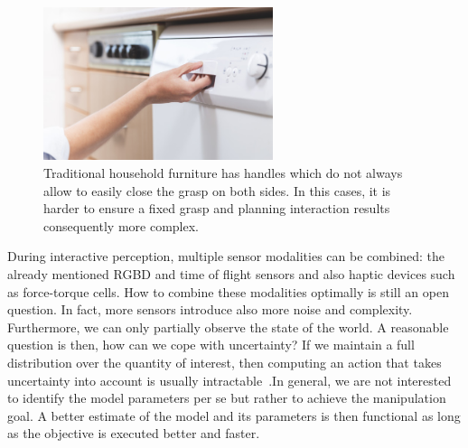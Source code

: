 \begin{figure}[h!]
    \centering
    \includegraphics[width=0.6\textwidth]{images/dishwasher_handle.png}
    \caption{Traditional household furniture has handles which do not always allow to easily close the grasp on both sides. In this cases, it is harder to ensure a fixed grasp and planning interaction results consequently more complex.}
    \label{fig:dishwasher_handle}
\end{figure}


During interactive perception, multiple sensor modalities can be combined: the already mentioned RGBD and time of flight sensors and also haptic devices such as force-torque cells. How to combine these modalities optimally is still an open question. In fact, more sensors introduce also more noise and complexity. Furthermore, we can only partially observe the state of the world. A reasonable question is then, how can we cope with uncertainty? If we maintain a full distribution over the quantity of interest, then computing an action that takes uncertainty into account is usually intractable~\cite{lavalle2006planning}.In general, we are not interested to identify the model parameters per se but rather to achieve the manipulation goal. A better estimate of the model and its parameters is then functional as long as the objective is executed better and faster.   

